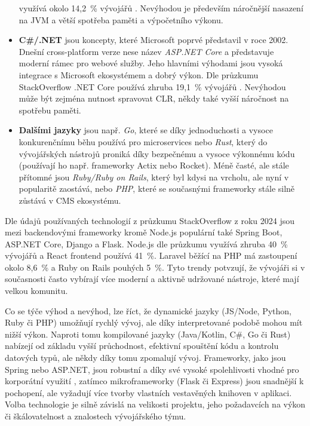 \begin{itemize}
        využívá okolo 14,2~\% vývojářů
        \cite{YHVfLHsNlUItkF6G,w6F4OYb0neliWLGP}. %
        Nevýhodou je především náročnější nasazení na JVM a větší spotřeba
        paměti a výpočetního výkonu.
    \item \textbf{C\#/.NET} jsou koncepty, které Microsoft poprvé
        představil v roce 2002. Dnešní cross-platform verze nese název
        \emph{ASP.NET Core} a představuje moderní rámec pro webové služby.
        Jeho hlavními výhodami jsou vysoká integrace s Microsoft ekosystémem
        a dobrý výkon. Dle průzkumu StackOverflow .NET Core používá
        zhruba 19,1~\% vývojářů
        \cite{YHVfLHsNlUItkF6G,w6F4OYb0neliWLGP}. %
        Nevýhodou může být zejména nutnost spravovat CLR, někdy také
        vyšší náročnost na spotřebu paměti.
    \item \textbf{Dalšími jazyky} jsou např. \emph{Go}, které se díky
        jednoduchosti a vysoce konkurenčnímu běhu používá pro microservices
        nebo \emph{Rust}, který do vývojářských nástrojů proniká díky
        bezpečnému a vysoce výkonnému kódu (používají ho např. frameworky
        Actix nebo Rocket). Méně časté, ale stále přítomné jsou
        \emph{Ruby/Ruby on Rails}, který byl kdysi na vrcholu, ale nyní
        v popularitě zaostává, nebo \emph{PHP}, které se současnými
        frameworky stále silně zůstává v CMS ekosystému.
\end{itemize}

Dle údajů používaných technologií z průzkumu StackOverflow z roku 2024
jsou mezi backendovými frameworky kromě Node.js populární také Spring
Boot, ASP.NET Core, Django a Flask. Node.js dle průzkumu využívá zhruba
40~\% vývojářů a React frontend používá 41~\%. Laravel běžící na PHP
má zastoupení okolo 8,6~\% a Ruby on Rails pouhých 5~\%. Tyto trendy
potvzují, že vývojáři si v současnosti často vybírají více moderní
a aktivně udržované nástroje, které mají velkou komunitu.
\cite{YHVfLHsNlUItkF6G,w6F4OYb0neliWLGP} %

Co se týče výhod a nevýhod, lze říct, že dynamické jazyky (JS/Node,
Python, Ruby či PHP) umožňují rychlý vývoj, ale díky interpretované
podobě mohou mít nižší výkon. Naproti tomu kompilované jazyky
(Java/Kotlin, C\#, Go či Rust) nabízejí od základu vyšší průchodnost,
efektivní spouštění kódu a kontrolu datových typů, ale někdy díky
tomu zpomalují vývoj. Frameworky, jako jsou Spring nebo ASP.NET,
jsou robustní a díky své vysoké spolehlivosti vhodné pro korporátní
využití \cite{YHVfLHsNlUItkF6G,w6F4OYb0neliWLGP}, %
zatímco mikroframeworky (Flask či Express) jsou snadnější k pochopení,
ale vyžadují více tvorby vlastních vestavěných knihoven v aplikaci.
Volba technologie je silně závislá na velikosti projektu, jeho
požadavcích na výkon či škálovatelnost a znalostech vývojářského
týmu.

